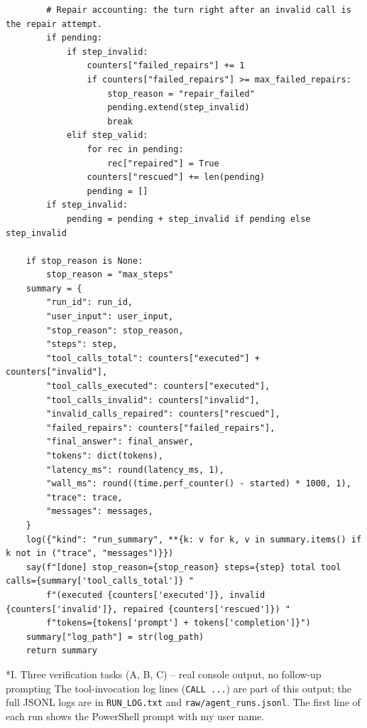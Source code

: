 \documentclass[11pt]{article}
\makeatletter
\renewcommand\subsection{\@startsection{subsection}{2}{\z@}{-2.2ex \@plus -1ex \@minus -.2ex}{0.8ex \@plus.2ex}{\normalfont\fontsize{12}{14.5}\selectfont\bfseries}}
\makeatother
\begin{document}
\begin{lstlisting}
        # Repair accounting: the turn right after an invalid call is the repair attempt.
        if pending:
            if step_invalid:
                counters["failed_repairs"] += 1
                if counters["failed_repairs"] >= max_failed_repairs:
                    stop_reason = "repair_failed"
                    pending.extend(step_invalid)
                    break
            elif step_valid:
                for rec in pending:
                    rec["repaired"] = True
                counters["rescued"] += len(pending)
                pending = []
        if step_invalid:
            pending = pending + step_invalid if pending else step_invalid

    if stop_reason is None:
        stop_reason = "max_steps"
    summary = {
        "run_id": run_id,
        "user_input": user_input,
        "stop_reason": stop_reason,
        "steps": step,
        "tool_calls_total": counters["executed"] + counters["invalid"],
        "tool_calls_executed": counters["executed"],
        "tool_calls_invalid": counters["invalid"],
        "invalid_calls_repaired": counters["rescued"],
        "failed_repairs": counters["failed_repairs"],
        "final_answer": final_answer,
        "tokens": dict(tokens),
        "latency_ms": round(latency_ms, 1),
        "wall_ms": round((time.perf_counter() - started) * 1000, 1),
        "trace": trace,
        "messages": messages,
    }
    log({"kind": "run_summary", **{k: v for k, v in summary.items() if k not in ("trace", "messages")}})
    say(f"[done] stop_reason={stop_reason} steps={step} total tool calls={summary['tool_calls_total']} "
        f"(executed {counters['executed']}, invalid {counters['invalid']}, repaired {counters['rescued']}) "
        f"tokens={tokens['prompt'] + tokens['completion']}")
    summary["log_path"] = str(log_path)
    return summary
\end{lstlisting}
\endgroup
\subsection*{I. Three verification tasks (A, B, C) -- real console output, no follow-up prompting}
The tool-invocation log lines (\texttt{CALL ...}) are part of this output; the full JSONL logs are in \texttt{RUN\_\allowbreak{}LOG.txt} and \texttt{raw/\allowbreak{}agent\_\allowbreak{}runs.jsonl}. The first line of each run shows the PowerShell prompt with my user name.
\end{document}
